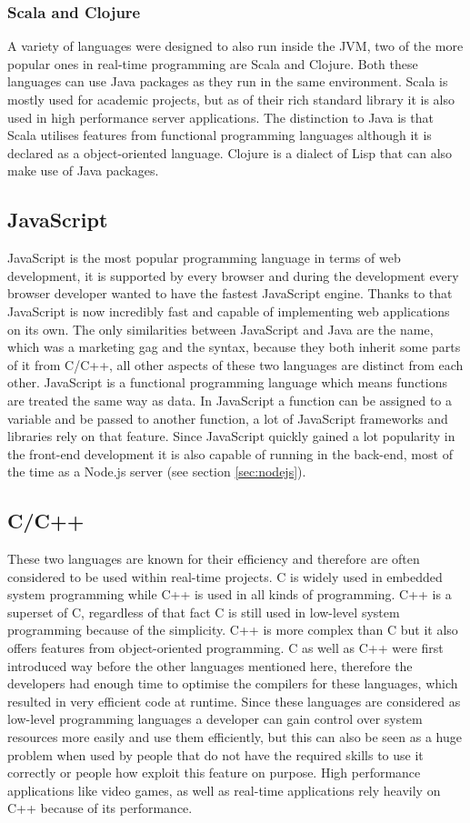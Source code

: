 \subsubsection{Scala and Clojure}
A variety of languages were designed to also run inside the JVM, two of the more popular ones in real-time programming are Scala and Clojure. Both these languages can use Java packages as they run in the same environment. Scala is mostly used for academic projects, but as of their rich standard library it is also used in high performance server applications. The distinction to Java is that Scala utilises features from functional programming languages although it is declared as a object-oriented language. Clojure is a dialect of Lisp that can also make use of Java packages.

\subsection{JavaScript}
JavaScript is the most popular programming language in terms of web development, it is supported by every browser and during the development every browser developer wanted to have the fastest JavaScript engine. Thanks to that JavaScript is now incredibly fast and capable of implementing web applications on its own. The only similarities between JavaScript and Java are the name, which was a marketing gag and the syntax, because they both inherit some parts of it from C/C++, all other aspects of these two languages are distinct from each other. JavaScript is a functional programming language which means functions are treated the same way as data. In JavaScript a function can be assigned to a variable and be passed to another function, a lot of JavaScript frameworks and libraries rely on that feature. Since JavaScript quickly gained a lot popularity in the front-end development it is also capable of running in the back-end, most of the time as a Node.js server (see section \vref{sec:nodejs}).

\subsection{C/C++}
These two languages are known for their efficiency and therefore are often considered to be used within real-time projects. C is widely used in embedded system programming while C++ is used in all kinds of programming. C++ is a superset of C, regardless of that fact C is still used in low-level system programming because of the simplicity. C++ is more complex than C but it also offers features from object-oriented programming. C as well as C++ were first introduced way before the other languages mentioned here, therefore the developers had enough time to optimise the compilers for these languages, which resulted in very efficient code at runtime. Since these languages are considered as low-level programming languages a developer can gain control over system resources more easily and use them efficiently, but this can also be seen as a huge problem when used by people that do not have the required skills to use it correctly or people how exploit this feature on purpose. High performance applications like video games, as well as real-time applications rely heavily on C++ because of its performance.

